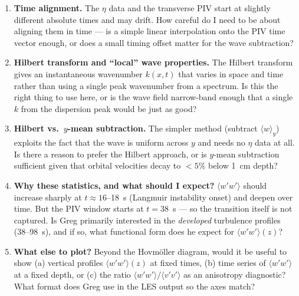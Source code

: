 \documentclass[11pt]{article}
\newcommand{\avg}[1]{\langle #1 \rangle}
\begin{document}
\begin{enumerate}

  \item \textbf{Time alignment.}
  The $\eta$ data and the transverse PIV start at slightly different
  absolute times and may drift.
  How careful do I need to be about aligning them in time ---
  is a simple linear interpolation onto the PIV time vector enough,
  or does a small timing offset matter for the wave subtraction?

  \item \textbf{Hilbert transform and ``local'' wave properties.}
  The Hilbert transform gives an instantaneous wavenumber $k(x,t)$
  that varies in space and time rather than using a single
  peak wavenumber from a spectrum.
  Is this the right thing to use here, or is the wave field
  narrow-band enough that a single $k$ from the dispersion peak
  would be just as good?

  \item \textbf{Hilbert vs.\ $y$-mean subtraction.}
  The simpler method (subtract $\avg{w}_y$) exploits the fact that
  the wave is uniform across $y$ and needs no $\eta$ data at all.
  Is there a reason to prefer the Hilbert approach, or is
  $y$-mean subtraction sufficient given that orbital velocities
  decay to $<5\%$ below 1~cm depth?

  \item \textbf{Why these statistics, and what should I expect?}
  $\avg{w'w'}$ should increase sharply at $t\approx16$--18~s
  (Langmuir instability onset) and deepen over time.
  But the PIV window starts at $t=38$~s --- so the transition
  itself is not captured.
  Is Greg primarily interested in the \emph{developed} turbulence
  profiles (38--98~s), and if so, what functional form does he
  expect for $\avg{w'w'}(z)$?

  \item \textbf{What else to plot?}
  Beyond the Hovm\"{o}ller diagram, would it be useful to show
  (a) vertical profiles $\avg{w'w'}(z)$ at fixed times,
  (b) time series of $\avg{w'w'}$ at a fixed depth,
  or (c) the ratio $\avg{w'w'}/\avg{v'v'}$ as an anisotropy
  diagnostic?
  What format does Greg use in the LES output so the axes match?

\end{enumerate}
\end{document}
